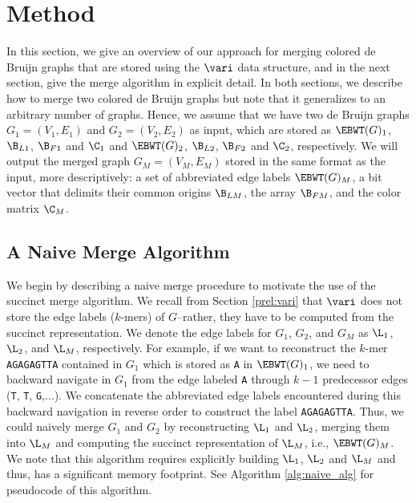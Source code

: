 \section*{Method}

In this section, we give an overview of our approach for merging colored de Bruijn graphs that are stored using the $\vari$ data structure, and in the next section, give the merge algorithm in explicit detail.  In both sections, we describe how to merge two colored de Bruijn graphs but note that it generalizes to an  arbitrary number of graphs.  Hence,  we assume that we have two de Bruijn graphs $G_1 = (V_1, E_1)$ and $G_2 = (V_2, E_2)$ as input, which are stored as $\EBWT(G)_1$, $\B_{L1}$, $\B_{F1}$ and $\C_1$ and $\EBWT(G)_2$, $\B_{L2}$, $\B_{F2}$ and  $\C_2 $, respectively.  We will output the merged graph $G_M = (V_M, E_M)$ stored in the same format as the input, more descriptively:  a set of abbreviated edge labels $\EBWT(G)_M$, a bit vector that delimits their common origins $\B_{LM}$, the array $\B_{FM}$, and the color matrix $\C_M$. %


\subsection*{A Naive Merge Algorithm}

We begin by describing a naive merge procedure to motivate the use of the succinct merge algorithm. We recall from Section \ref{prel:vari} that $\vari$ does not store the edge labels ($k$-mers) of $G$--rather, they have to be computed from the succinct representation.  We denote the edge labels for $G_1$, $G_2$, and $G_M$ as $\L_1$, $\L_2$, and $\L_M$, respectively.  For example, if we want to reconstruct the $k$-mer {\tt AGAGAGTTA} contained in $G_1$ which is stored as {\tt A} in $\EBWT(G)_1$, we need to backward navigate in $G_1$ from the edge labeled {\tt A} through $k-1$ predecessor edges ({\tt T}, {\tt T}, {\tt G},...). We concatenate the abbreviated edge labels encountered during this backward navigation in reverse order to construct the label {\tt AGAGAGTTA}.  Thus, we could naively merge $G_1$ and $G_2$ by reconstructing  $\L_{1}$ and $\L_{2}$, merging them into $\L_{M}$ and computing the succinct representation of $\L_{M}$, i.e., $\EBWT(G)_M$.   We note that this algorithm requires explicitly building $\L_1$, $\L_2$ and $\L_M$ and thus, has a significant memory footprint.  See Algorithm \ref{alg:naive_alg} for pseudocode of this algorithm. 

